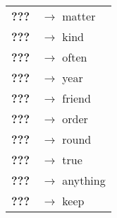 \begin{tabular}{rl}
\textbf{???} & $\rightarrow$ matter \\
\textbf{???} & $\rightarrow$ kind \\
\textbf{???} & $\rightarrow$ often \\
\textbf{???} & $\rightarrow$ year \\
\textbf{???} & $\rightarrow$ friend \\
\textbf{???} & $\rightarrow$ order \\
\textbf{???} & $\rightarrow$ round \\
\textbf{???} & $\rightarrow$ true \\
\textbf{???} & $\rightarrow$ anything \\
\textbf{???} & $\rightarrow$ keep \\
\end{tabular}



